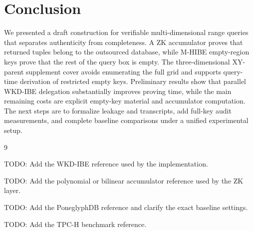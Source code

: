\documentclass[11pt]{article}
\begin{document}
\section{Conclusion}

We presented a draft construction for verifiable multi-dimensional range queries that separates authenticity from completeness. A ZK accumulator proves that returned tuples belong to the outsourced database, while M-HIBE empty-region keys prove that the rest of the query box is empty. The three-dimensional XY-parent supplement cover avoids enumerating the full grid and supports query-time derivation of restricted empty keys. Preliminary results show that parallel WKD-IBE delegation substantially improves proving time, while the main remaining costs are explicit empty-key material and accumulator computation. The next steps are to formalize leakage and transcripts, add full-key audit measurements, and complete baseline comparisons under a unified experimental setup.


\begin{thebibliography}{9}

TODO: Add the WKD-IBE reference used by the implementation.

TODO: Add the polynomial or bilinear accumulator reference used by the ZK layer.

TODO: Add the PoneglyphDB reference and clarify the exact baseline settings.

TODO: Add the TPC-H benchmark reference.

\end{thebibliography}
\end{document}
